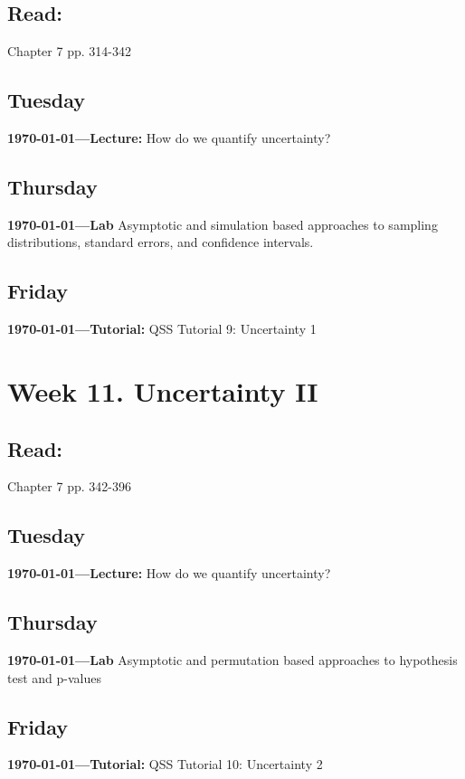 \subsection{Read:} 
\citet{Imai2022-pm} Chapter 7 pp. 314-342

\subsection{Tuesday} \textbf{\today---Lecture:} How do we quantify uncertainty?
\AdvanceDate[2]

\subsection{Thursday} \textbf{\today---Lab} Asymptotic and simulation based approaches to sampling distributions, standard errors, and confidence intervals. 

\AdvanceDate[1]
\subsection{Friday} \textbf{\today---Tutorial:} QSS Tutorial 9: Uncertainty 1
\AdvanceDate[4]



\vspace{2em}


\section{Week 11. Uncertainty II}

\subsection{Read:}

\citet{Imai2022-pm} Chapter 7 pp. 342-396

\subsection{Tuesday} \textbf{\today---Lecture:} How do we quantify uncertainty?
\AdvanceDate[2]

\subsection{Thursday} \textbf{\today---Lab} Asymptotic and permutation based approaches to hypothesis test and p-values 
\AdvanceDate[1]
\subsection{Friday} \textbf{\today---Tutorial:} QSS Tutorial 10: Uncertainty 2
\AdvanceDate[2]

